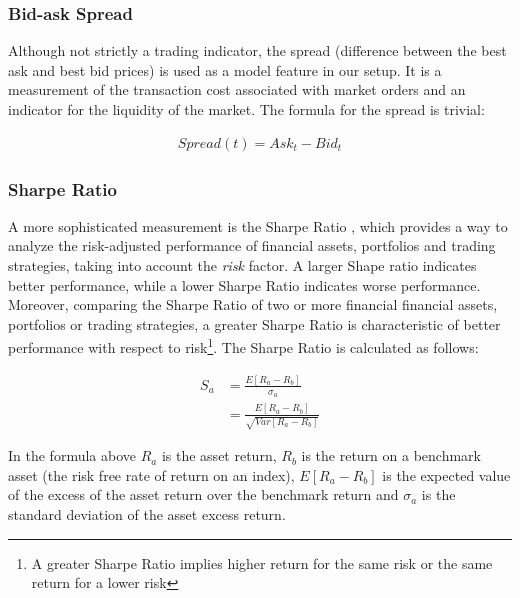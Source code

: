 \begin{multicols}{2}
\subsubsection{Bid-ask Spread}

Although not strictly a trading indicator, the spread (difference between the
best ask and best bid prices) is used as a model feature in our setup. It is a
measurement of the transaction cost associated with market orders and an
indicator for the liquidity of the market. The formula for the spread is
trivial:

\begin{Figure}
  \begin{align*}
    \mathit{Spread(t)} = \mathit{Ask_t} - \mathit{Bid_t}
  \end{align*}
\end{Figure}

\subsubsection{Sharpe Ratio}

\noindent A more sophisticated measurement is the Sharpe Ratio
\citep{sharpe1966}, which provides a way to analyze the risk-adjusted
performance of financial assets, portfolios and trading strategies, taking into
account the \textit{risk} factor.  A larger Shape ratio indicates better
performance, while a lower Sharpe Ratio indicates worse performance.  Moreover,
comparing the Sharpe Ratio of two or more financial financial assets, portfolios
or trading strategies, a greater Sharpe Ratio is characteristic of better
performance with respect to risk\footnote{A greater Sharpe Ratio implies higher
  return for the same risk or the same return for a lower risk}.  The Sharpe
Ratio is calculated as follows:

\begin{Figure}
  \begin{align*}
    S_a & = \frac{E[R_a - R_b]}{\sigma _a} \\
        & = \frac{E[R_a - R_b]}{\sqrt{Var[R_a - R_b]}}
  \end{align*}
\end{Figure}

\noindent In the formula above $R_a$ is the asset return, $R_b$ is the return on
a benchmark asset (the risk free rate of return on an index), $E[R_a-R_b]$ is
the expected value of the excess of the asset return over the benchmark return
and $\sigma_a$ is the standard deviation of the asset excess return.


\end{multicols}
